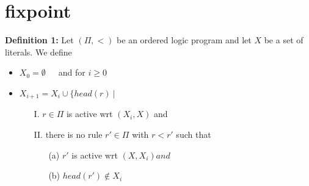 \section{fixpoint}

\begin{frame}
  \begin{block}{\textbf{Definition 1:}}
    Let $(\Pi, <)$ be an ordered
    logic program and let $X$ be a set of literals. We define
    \begin{itemize}
      \item $X_0 = \emptyset$~~~and for $i \geq 0$
      \item $X_{i+1} = X_i \cup \{head(r)~|~$
          \begin{itemize}
            \item[I.] $r \in \Pi$ is active wrt $(X_i, X)$ and
            \item[II.] there is no rule $r' \in \Pi$ with $r < r'$ such that
              \begin{itemize}
                \item[(a)] $r'$ is active wrt $(X, X_i) and$
                \item[(b)] $head(r') \notin X_i$
              \end{itemize}
          \end{itemize}
      \end{itemize}
    \end{block}
  \end{frame}
